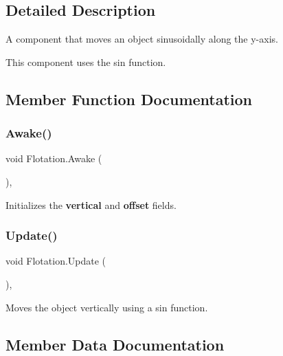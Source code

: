 \subsection{Detailed Description}
A component that moves an object sinusoidally along the y-\/axis. 

This component uses the sin function. 

\subsection{Member Function Documentation}
\mbox{\label{class_flotation_a19af8367d8cdd79605ff0576fe1ea532}} 
\subsubsection{\texorpdfstring{Awake()}{Awake()}}
{\footnotesize\ttfamily void Flotation.\+Awake (\begin{DoxyParamCaption}{ }\end{DoxyParamCaption})\hspace{0.3cm}{\ttfamily [inline]}, {\ttfamily [protected]}}



Initializes the {\bfseries vertical} and {\bfseries offset} fields. 

\mbox{\label{class_flotation_a625c95b86b0892446db94645731a2a81}} 
\subsubsection{\texorpdfstring{Update()}{Update()}}
{\footnotesize\ttfamily void Flotation.\+Update (\begin{DoxyParamCaption}{ }\end{DoxyParamCaption})\hspace{0.3cm}{\ttfamily [inline]}, {\ttfamily [protected]}}



Moves the object vertically using a sin function. 



\subsection{Member Data Documentation}
\mbox{\label{class_flotation_af38935704bdd56408d8ee8dbd9fffe5d}} 

